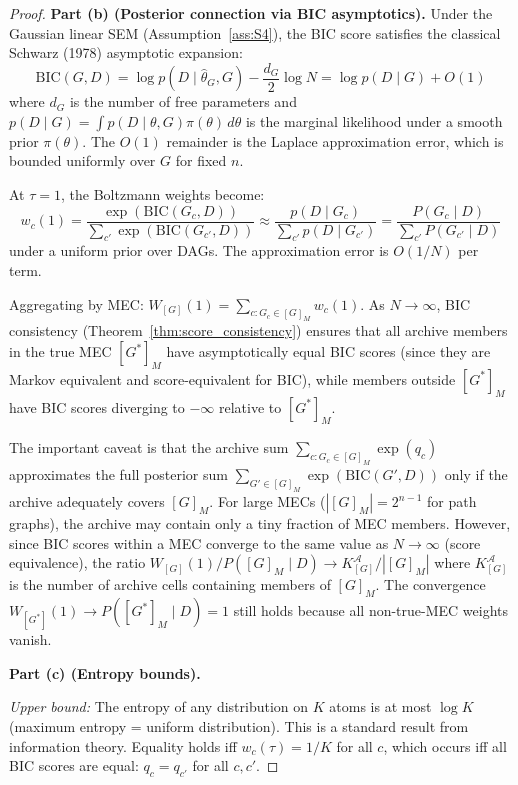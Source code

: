 \documentclass{article}
\theoremstyle{definition}
\theoremstyle{plain}
\theoremstyle{remark}
\begin{document}
\begin{proof}
\textbf{Part (b) (Posterior connection via BIC asymptotics).}
Under the Gaussian linear SEM (Assumption~\ref{ass:S4}), the BIC score satisfies
the classical Schwarz (1978) asymptotic expansion:
\begin{equation}
  \mathrm{BIC}(G, D) = \log p(D \mid \hat{\theta}_G, G)
  - \frac{d_G}{2}\log N = \log p(D \mid G) + O(1)
\end{equation}
where $d_G$ is the number of free parameters and $p(D \mid G) = \int p(D \mid \theta, G)
\pi(\theta) \,d\theta$ is the marginal likelihood under a smooth prior $\pi(\theta)$.
The $O(1)$ remainder is the Laplace approximation error, which is bounded uniformly over
$G$ for fixed $n$.

At $\tau = 1$, the Boltzmann weights become:
\begin{equation}
  w_c(1) = \frac{\exp(\mathrm{BIC}(G_c, D))}{\sum_{c'} \exp(\mathrm{BIC}(G_{c'}, D))}
  \approx \frac{p(D \mid G_c)}{\sum_{c'} p(D \mid G_{c'})}
  = \frac{P(G_c \mid D)}{\sum_{c'} P(G_{c'} \mid D)}
\end{equation}
under a uniform prior over DAGs. The approximation error is $O(1/N)$ per term.

Aggregating by MEC: $W_{[G]}(1) = \sum_{c : G_c \in [G]_M} w_c(1)$. As $N \to \infty$,
BIC consistency (Theorem~\ref{thm:score_consistency}) ensures that all archive members in
the true MEC $[G^*]_M$ have asymptotically equal BIC scores (since they are Markov
equivalent and score-equivalent for BIC), while members outside $[G^*]_M$ have
BIC scores diverging to $-\infty$ relative to $[G^*]_M$.

The important caveat is that the archive sum $\sum_{c : G_c \in [G]_M} \exp(q_c)$
approximates the full posterior sum $\sum_{G' \in [G]_M} \exp(\mathrm{BIC}(G', D))$ only
if the archive adequately covers $[G]_M$. For large MECs ($|[G]_M| = 2^{n-1}$ for path
graphs), the archive may contain only a tiny fraction of MEC members. However, since BIC
scores within a MEC converge to the same value as $N \to \infty$ (score equivalence), the
ratio $W_{[G]}(1) / P([G]_M \mid D) \to K_{[G]}^{\mathcal{A}} / |[G]_M|$ where
$K_{[G]}^{\mathcal{A}}$ is the number of archive cells containing members of $[G]_M$.
The convergence $W_{[G^*]}(1) \to P([G^*]_M \mid D) = 1$ still holds because all
non-true-MEC weights vanish.

\textbf{Part (c) (Entropy bounds).}

\emph{Upper bound:} The entropy of any distribution on $K$ atoms is at most $\log K$
(maximum entropy = uniform distribution). This is a standard result from information
theory. Equality holds iff $w_c(\tau) = 1/K$ for all $c$, which occurs iff all BIC scores
are equal: $q_c = q_{c'}$ for all $c, c'$.


\end{proof}
\end{document}
